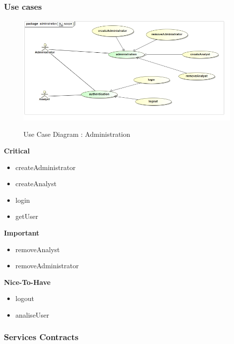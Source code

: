 \documentclass{article}
\begin{document}
		\subsubsection{Use cases}
		\begin{figure}[H]
		\includegraphics[width=\textwidth]{images/uc__administration__scope.jpg}  \\
		\caption{Use Case Diagram : Administration}
		\end{figure}

		\begin{flushleft}
			\textbf{Critical}
				\begin{itemize}
					\item createAdministrator
					\item createAnalyst
					\item login
					\item getUser
				\end{itemize}
			\textbf{Important}
				\begin{itemize}
					\item removeAnalyst
					\item removeAdministrator
				\end{itemize}

			\textbf{Nice-To-Have}
				\begin{itemize}
					\item logout
					\item analiseUser
				\end{itemize}
		\end{flushleft}

		\subsubsection{Services Contracts}
\end{document}
